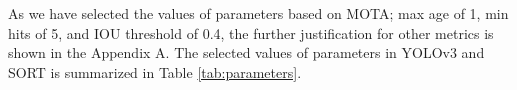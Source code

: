 As we have selected the values of parameters based on MOTA; max age of 1, min hits of 5, and IOU threshold of 0.4, the further justification for other metrics is shown in the Appendix A. The selected values of parameters in YOLOv3 and SORT is summarized in Table \ref{tab:parameters}.
